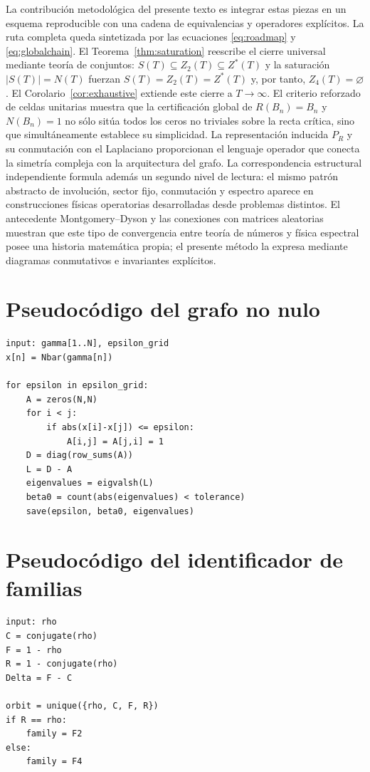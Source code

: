 \documentclass[11pt]{amsart}
\theoremstyle{definition}
\theoremstyle{remark}
\begin{document}
La contribución metodológica del presente texto es integrar estas piezas en un esquema reproducible con una cadena de equivalencias y operadores explícitos. La ruta completa queda sintetizada por las ecuaciones \eqref{eq:roadmap} y \eqref{eq:globalchain}. El Teorema~\ref{thm:saturation} reescribe el cierre universal mediante teoría de conjuntos: $S(T)\subseteq Z_2(T)\subseteq Z^*(T)$ y la saturación $|S(T)|=N(T)$ fuerzan $S(T)=Z_2(T)=Z^*(T)$ y, por tanto, $Z_4(T)=\varnothing$. El Corolario~\ref{cor:exhaustive} extiende este cierre a $T\to\infty$. El criterio reforzado de celdas unitarias muestra que la certificación global de $R(B_n)=B_n$ y $N(B_n)=1$ no sólo sitúa todos los ceros no triviales sobre la recta crítica, sino que simultáneamente establece su simplicidad. La representación inducida $P_R$ y su conmutación con el Laplaciano proporcionan el lenguaje operador que conecta la simetría compleja con la arquitectura del grafo. La correspondencia estructural independiente formula además un segundo nivel de lectura: el mismo patrón abstracto de involución, sector fijo, conmutación y espectro aparece en construcciones físicas operatorias desarrolladas desde problemas distintos. El antecedente Montgomery--Dyson y las conexiones con matrices aleatorias muestran que este tipo de convergencia entre teoría de números y física espectral posee una historia matemática propia; el presente método la expresa mediante diagramas conmutativos e invariantes explícitos.

\appendix
\section{Pseudocódigo del grafo no nulo}
\begin{verbatim}
input: gamma[1..N], epsilon_grid
x[n] = Nbar(gamma[n])

for epsilon in epsilon_grid:
    A = zeros(N,N)
    for i < j:
        if abs(x[i]-x[j]) <= epsilon:
            A[i,j] = A[j,i] = 1
    D = diag(row_sums(A))
    L = D - A
    eigenvalues = eigvalsh(L)
    beta0 = count(abs(eigenvalues) < tolerance)
    save(epsilon, beta0, eigenvalues)
\end{verbatim}

\section{Pseudocódigo del identificador de familias}
\begin{verbatim}
input: rho
C = conjugate(rho)
F = 1 - rho
R = 1 - conjugate(rho)
Delta = F - C

orbit = unique({rho, C, F, R})
if R == rho:
    family = F2
else:
    family = F4
\end{verbatim}
\end{document}
